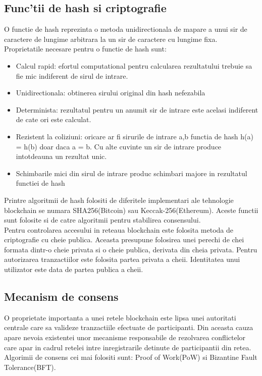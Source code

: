 \documentclass[12pt,a4paper,twoside]{report}
\begin{document}
\subsection{Func'tii de hash si criptografie}
	O functie de hash reprezinta o metoda unidirectionala de mapare a unui sir de caractere de lungime arbitrara la un sir de caractere cu lungime fixa. Proprietatile necesare pentru o functie de hash sunt:
	\begin{itemize}
		\item Calcul rapid: efortul computational pentru calcularea rezultatului trebuie sa fie mic indiferent de sirul de intrare.
		\item Unidirectionala: obtinerea sirului original din hash nefezabila
		\item Determinista: rezultatul pentru un anumit sir de intrare este acelasi indiferent de cate ori este calculat. 
		\item Rezistent la coliziuni: oricare ar fi sirurile de intrare a,b functia de hash h(a) = h(b) doar daca a = b. Cu alte cuvinte un sir de intrare produce intotdeauna un rezultat unic.
		\item Schimbarile mici din sirul de intrare produc schimbari majore in rezultatul functiei de hash
\end{itemize}		
	 Printre algoritmii de hash folositi de diferitele implementari ale tehnologie blockchain se numara SHA256(Bitcoin) sau Keccak-256(Ethereum). Aceste functii sunt folosite si de catre algoritmii pentru stabilirea consensului.\\
		Pentru controlarea accesului in reteaua blockchain este folosita metoda de criptografie cu cheie publica. Aceasta presupune folosirea unei perechi de chei formata dintr-o cheie privata si o cheie publica, derivata din cheia privata. Pentru autorizarea tranzactiilor este folosita partea privata a cheii. Identitatea unui utilizator este data de partea publica a cheii. 
		\subsection{Mecanism de consens}
		O proprietate importanta a unei retele blockchain este lipsa unei autoritati centrale care sa valideze tranzactiile efectuate de participanti. Din aceasta cauza apare nevoia existentei unor mecanisme responsabile de rezolvarea conflictelor care apar in cadrul retelei intre inregistrarile detinute de participantii din retea. Algorimii de consens cei mai folositi sunt: Proof of Work(PoW) si Bizantine Fault Tolerance(BFT).
	
\end{document}
